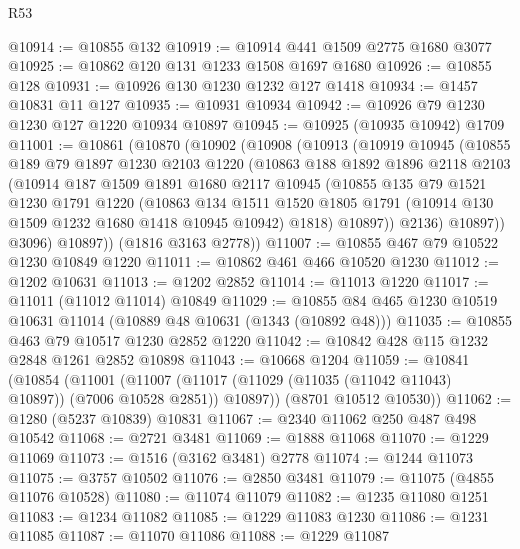 \begin{lexlean}{R53}
\begin{coremodule}
@10914 := @10855 @132
@10919 := @10914 @441 @1509 @2775 @1680 @3077
@10925 := @10862 @120 @131 @1233 @1508 @1697 @1680
@10926 := @10855 @128
@10931 := @10926 @130 @1230 @1232 @127 @1418
@10934 := @1457 @10831 @11 @127
@10935 := @10931 @10934
@10942 := @10926 @79 @1230 @1230 @127 @1220 @10934 @10897
@10945 := @10925 (@10935 @10942) @1709
@11001 := @10861
    (@10870
      (@10902
        (@10908
          (@10913
            (@10919
              @10945
              (@10855
                @189
                @79
                @1897
                @1230
                @2103
                @1220
                (@10863
                  @188
                  @1892
                  @1896
                  @2118
                  @2103
                  (@10914
                    @187
                    @1509
                    @1891
                    @1680
                    @2117
                    @10945
                    (@10855
                      @135
                      @79
                      @1521
                      @1230
                      @1791
                      @1220
                      (@10863
                        @134
                        @1511
                        @1520
                        @1805
                        @1791
                        (@10914 @130 @1509 @1232 @1680 @1418 @10945 @10942)
                        @1818)
                      @10897))
                  @2136)
                @10897))
            @3096)
          @10897))
      (@1816 @3163 @2778))
@11007 := @10855 @467 @79 @10522 @1230 @10849 @1220
@11011 := @10862 @461 @466 @10520 @1230
@11012 := @1202 @10631
@11013 := @1202 @2852
@11014 := @11013 @1220
@11017 := @11011 (@11012 @11014) @10849
@11029 := @10855 @84 @465 @1230 @10519 @10631 @11014 (@10889 @48 @10631 (@1343 (@10892 @48)))
@11035 := @10855 @463 @79 @10517 @1230 @2852 @1220
@11042 := @10842 @428 @115 @1232 @2848 @1261 @2852 @10898
@11043 := @10668 @1204
@11059 := @10841
    (@10854
      (@11001
        (@11007 (@11017 (@11029 (@11035 (@11042 @11043) @10897)) (@7006 @10528 @2851)) @10897))
      (@8701 @10512 @10530))
@11062 := @1280 (@5237 @10839) @10831
@11067 := @2340 @11062 @250 @487 @498 @10542
@11068 := @2721 @3481
@11069 := @1888 @11068
@11070 := @1229 @11069
@11073 := @1516 (@3162 @3481) @2778
@11074 := @1244 @11073
@11075 := @3757 @10502
@11076 := @2850 @3481
@11079 := @11075 (@4855 @11076 @10528)
@11080 := @11074 @11079
@11082 := @1235 @11080 @1251
@11083 := @1234 @11082
@11085 := @1229 @11083 @1230
@11086 := @1231 @11085
@11087 := @11070 @11086
@11088 := @1229 @11087

\end{coremodule}
\end{lexlean}
